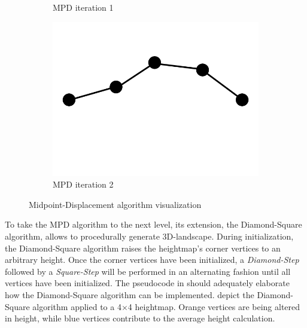 \documentclass[11pt,a4paper,twoside,openright]{report}
\begin{document}
\begin{figure}[h]
\begin{subfigure}[b]{0.32\textwidth}
    \caption{MPD iteration 1}
    \label{fig:mpd1}
  \end{subfigure}
  \begin{subfigure}[b]{0.32\textwidth}
    \includegraphics[width=\textwidth]{mpd2.png}
    \caption{MPD iteration 2}
    \label{fig:mpd2}
  \end{subfigure}
  \caption{Midpoint-Displacement algorithm visualization}
\end{figure}

\noindent To take the MPD algorithm to the next level, its extension, the Diamond-Square algorithm, allows to procedurally generate 3D-landscape. During initialization, the Diamond-Square algorithm raises the heightmap's corner vertices to an arbitrary height. Once the corner vertices have been initialized, a \emph{Diamond-Step} followed by a \emph{Square-Step} will be performed in an alternating fashion until all vertices have been initialized. The pseudocode in  should adequately elaborate how the Diamond-Square algorithm can be implemented.  depict the Diamond-Square algorithm applied to a 4$\times$4 heightmap. Orange vertices are being altered in height, while blue vertices contribute to the average height calculation.
\end{document}
